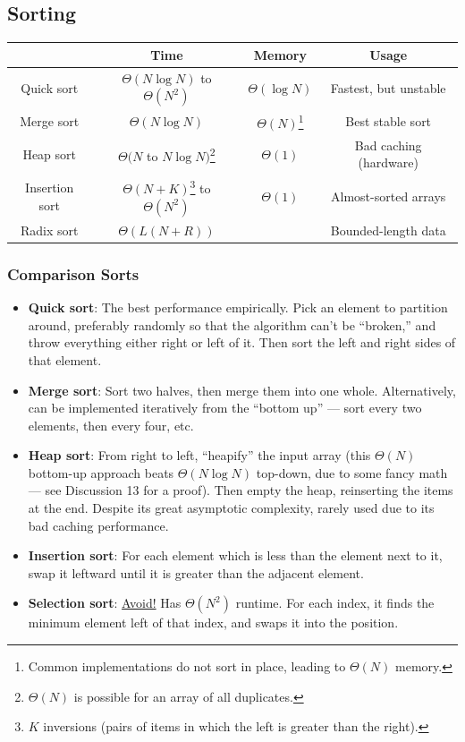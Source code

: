 \documentclass{article}
\begin{document}
\subsection*{Sorting}

\begin{center}
    \begin{tabular}{c || c c c} 
        & \textbf{Time} & \textbf{Memory} & \textbf{Usage} \\ [0.5ex]
        \hline\hline
        Quick sort & $\Theta(N\log N)$ to $\Theta(N^2)$ & $\Theta(\log N)$ & Fastest, but unstable \\
        Merge sort & $\Theta(N\log N)$ & $\Theta(N)$\footnote{Common implementations do not sort in place, leading to $\Theta(N)$ memory.} & Best stable sort \\
        Heap sort & $\Theta(N$ to $N\log N)$\footnote{$\Theta(N)$ is possible for an array of all duplicates.} & $\Theta(1)$ & Bad caching (hardware) \\
        Insertion sort & $\Theta(N + K)$\footnote{$K$ inversions (pairs of items in which the left is greater than the right).} to $\Theta(N^2)$ & $\Theta(1)$ & Almost-sorted arrays \\
        Radix sort & $\Theta(L(N + R))$ &  & Bounded-length data \\ [1ex]
    \end{tabular}
\end{center}

\subsubsection*{Comparison Sorts}

\begin{itemize}
    \item \textbf{Quick sort}: The best performance empirically. Pick an element to partition around, preferably randomly so that the algorithm can't be ``broken,'' and throw everything either right or left of it. Then sort the left and right sides of that element.
    \item \textbf{Merge sort}: Sort two halves, then merge them into one whole. Alternatively, can be implemented iteratively from the ``bottom up'' --- sort every two elements, then every four, etc.
    \item \textbf{Heap sort}: From right to left, ``heapify'' the input array (this $\Theta(N)$ bottom-up approach beats $\Theta(N\log N)$ top-down, due to some fancy math --- see Discussion 13 for a proof). Then empty the heap, reinserting the items at the end. Despite its great asymptotic complexity, rarely used due to its bad caching performance.
    \item \textbf{Insertion sort}: For each element which is less than the element next to it, swap it leftward until it is greater than the adjacent element.
    \item \textbf{Selection sort}: \underline{Avoid!} Has $\Theta(N^2)$ runtime. For each index, it finds the minimum element left of that index, and swaps it into the position.
\end{itemize}
\end{document}
